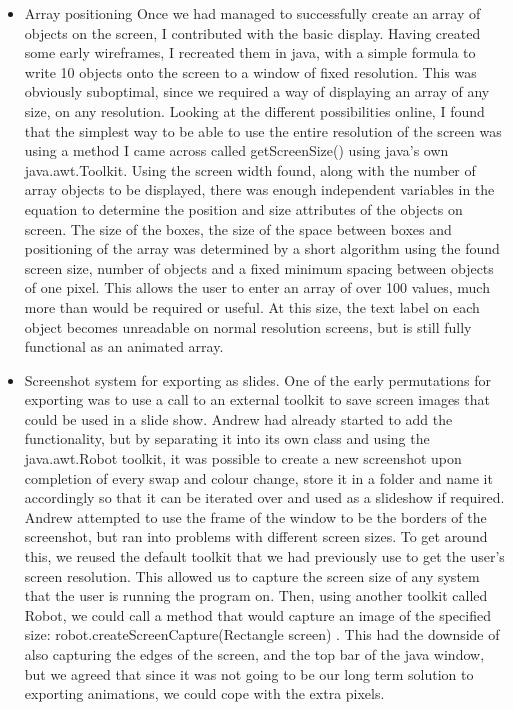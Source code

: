 \documentclass{l3proj}
\begin{document}
\begin{itemize} 
\item Array positioning
 Once we had managed to successfully create an array of objects on the screen, I contributed with the basic display. Having created some early wireframes, I recreated them in java, with a simple formula to write 10 objects onto the screen to a window of fixed resolution. This was obviously suboptimal, since we required a way of displaying an array of any size, on any resolution. Looking at the different possibilities online, I found that the simplest way to be able to use the entire resolution of the screen was using a method I came across called getScreenSize() using java’s own java.awt.Toolkit. Using the screen width found, along with the number of array objects to be displayed, there was enough independent variables in the equation to determine the position and size attributes of the objects on screen. The size of the boxes, the size of the space between boxes and positioning of the array was determined by a short algorithm using the found screen size, number of objects and a fixed minimum spacing between objects of one pixel. This allows the user to enter an array of over 100 values, much more than would be required or useful. At this size, the text label on each object becomes unreadable on normal resolution screens, but is still fully functional as an animated array. 

\item Screenshot system for exporting as slides.
 One of the early permutations for exporting was to use a call to an external toolkit to save screen images that could be used in a slide show. Andrew had already started to add the functionality, but by separating it into its own class and using the java.awt.Robot toolkit, it was possible to create a new screenshot upon completion of every swap and colour change, store it in a folder and name it accordingly so that it can be iterated over and used as a slideshow if required. Andrew attempted to use the frame of the window to be the borders of the screenshot, but ran into problems with different screen sizes. To get around this, we reused the default toolkit that we had previously use to get the user’s screen resolution. This allowed us to capture the screen size of any system that the user is running the program on. Then, using another toolkit called Robot, we could call a method that would capture an image of the specified size:
robot.createScreenCapture(Rectangle screen) . This had the downside of also capturing the edges of the screen, and the top bar of the java window, but we agreed that since it was not going to be our long term solution to exporting animations, we could cope with the extra pixels.


\end{itemize}
\end{document}
